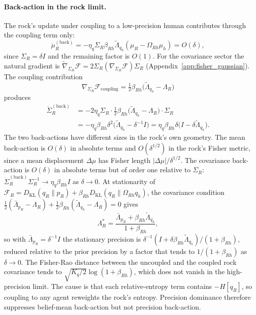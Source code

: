 \documentclass[11pt]{article}
\begin{document}
\paragraph{Back-action in the rock limit.} The rock's update under coupling to a low-precision human contributes through the coupling term only:
\begin{equation}
\dot{\mu}_R^{(\mathrm{back})} = -\eta_q \Sigma_R \beta_{Rh} \tilde{\Lambda}_{q_h}(\mu_R - \Omega_{Rh}\mu_h) = O(\delta),
\label{eq:rock_back_mu}
\end{equation}
since $\Sigma_R = \delta I$ and the remaining factor is $O(1)$. For the covariance sector the natural gradient is $\tilde{\nabla}_{\Sigma_R}\mathcal{F} = 2\Sigma_R(\nabla_{\Sigma_R}\mathcal{F})\Sigma_R$ (Appendix~\ref{app:fisher_gaussian}). The coupling contribution
\begin{equation}
\nabla_{\Sigma_R}\mathcal{F}_{\mathrm{coupling}} = \tfrac{1}{2}\beta_{Rh}\big(\tilde{\Lambda}_{q_h} - \Lambda_R\big)
\end{equation}
produces
\begin{equation}
\begin{aligned}
\dot{\Sigma}_R^{(\mathrm{back})} &= -2\eta_q \Sigma_R \cdot \tfrac{1}{2}\beta_{Rh}\big(\tilde{\Lambda}_{q_h} - \Lambda_R\big)\cdot \Sigma_R \\
&= -\eta_q \beta_{Rh} \delta^2 \big(\tilde{\Lambda}_{q_h} - \delta^{-1}I\big) = \eta_q\beta_{Rh}\delta\big(I - \delta\tilde{\Lambda}_{q_h}\big).
\end{aligned}
\label{eq:rock_back_sigma}
\end{equation}
The two back-actions have different sizes in the rock's own geometry. The mean back-action is $O(\delta)$ in absolute terms and $O(\delta^{1/2})$ in the rock's Fisher metric, since a mean displacement $\Delta\mu$ has Fisher length $|\Delta\mu|/\delta^{1/2}$. The covariance back-action is $O(\delta)$ in absolute terms but of order one relative to $\Sigma_R$: $\dot{\Sigma}_R^{(\mathrm{back})}\Sigma_R^{-1} \to \eta_q\beta_{Rh}I$ as $\delta \to 0$. At stationarity of $\mathcal{F}_R = D_{\mathrm{KL}}(q_R\|p_R) + \beta_{Rh}D_{\mathrm{KL}}(q_R\|\Omega_{Rh}q_h)$, the covariance condition $\tfrac{1}{2}(\bar{\Lambda}_{p_R} - \Lambda_R) + \tfrac{1}{2}\beta_{Rh}(\tilde{\Lambda}_{q_h} - \Lambda_R) = 0$ gives
\begin{equation}
\Lambda_R^* = \frac{\bar{\Lambda}_{p_R} + \beta_{Rh}\tilde{\Lambda}_{q_h}}{1 + \beta_{Rh}},
\end{equation}
so with $\bar{\Lambda}_{p_R} = \delta^{-1}I$ the stationary precision is $\delta^{-1}(I + \delta\beta_{Rh}\tilde{\Lambda}_{q_h})/(1 + \beta_{Rh})$, reduced relative to the prior precision by a factor that tends to $1/(1 + \beta_{Rh})$ as $\delta \to 0$. The Fisher-Rao distance between the uncoupled and the coupled rock covariance tends to $\sqrt{K_q/2}\log(1 + \beta_{Rh})$, which does not vanish in the high-precision limit. The cause is that each relative-entropy term contains $-H[q_R]$, so coupling to any agent reweights the rock's entropy. Precision dominance therefore suppresses belief-mean back-action but not precision back-action.
\end{document}
